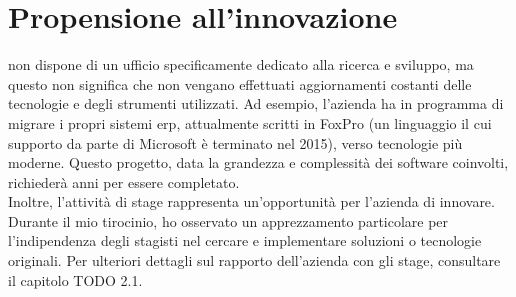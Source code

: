 \section{Propensione all'innovazione}
{\company} non dispone di un ufficio specificamente dedicato alla ricerca e sviluppo, ma questo non significa che non 
vengano effettuati aggiornamenti costanti delle tecnologie e degli strumenti utilizzati. Ad esempio, l'azienda ha 
in programma di migrare i propri sistemi \gls{erp}, attualmente scritti in FoxPro (un linguaggio il cui supporto da 
parte di Microsoft è terminato nel 2015), verso tecnologie più moderne. Questo progetto, data la grandezza e 
complessità dei software coinvolti, richiederà anni per essere completato.\\
Inoltre, l'attività di stage rappresenta un'opportunità per l'azienda di innovare. Durante il mio tirocinio, 
ho osservato un apprezzamento particolare per l'indipendenza degli stagisti nel cercare e implementare 
soluzioni o tecnologie originali. Per ulteriori dettagli sul rapporto dell'azienda con gli stage, consultare il 
capitolo TODO 2.1.
